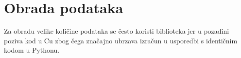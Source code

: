 \section{Obrada podataka}

Za obradu velike količine podataka se često koristi  biblioteka
jer u pozadini poziva kod u Cu zbog čega značajno ubrzava izračun u usporedbi s
identičnim kodom u Pythonu.

